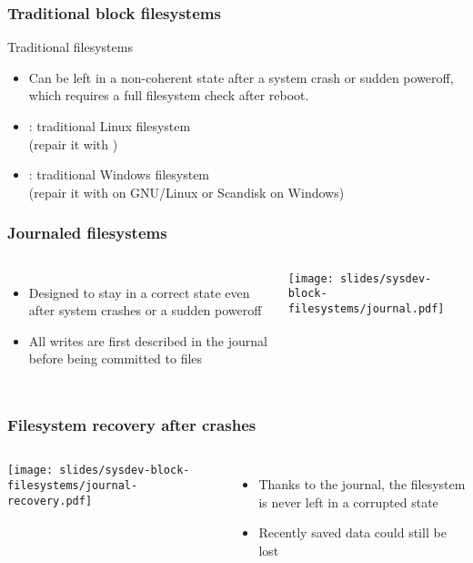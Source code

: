 \begin{frame}
  \frametitle{Traditional block filesystems}
  Traditional filesystems
  \begin{itemize}
  \item Can be left in a non-coherent state after a system crash or
    sudden poweroff, which requires a full filesystem check after
    reboot.
  \item {}: traditional Linux filesystem\\
    (repair it with )
  \item {}: traditional Windows filesystem\\
    (repair it with  on GNU/Linux or Scandisk on
    Windows)
  \end{itemize}
\end{frame}

\begin{frame}
  \frametitle{Journaled filesystems}
  \begin{columns}
    \begin{itemize}
    \item Designed to stay in a correct state even after system crashes
      or a sudden poweroff
    \item All writes are first described in the journal before being
      committed to files
    \end{itemize}
    \texttt{[image: slides/sysdev-block-filesystems/journal.pdf]}
  \end{columns}
\end{frame}

\begin{frame}
  \frametitle{Filesystem recovery after crashes}
  \begin{columns}
    \texttt{[image: slides/sysdev-block-filesystems/journal-recovery.pdf]}
    \begin{itemize}
    \item Thanks to the journal, the filesystem is never left in a
      corrupted state
    \item Recently saved data could still be lost
    \end{itemize}
  \end{columns}
\end{frame}

